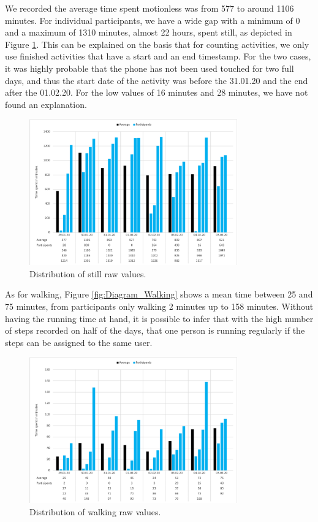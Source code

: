 
We recorded the average time spent motionless was from 577 to around 1106 minutes. For individual participants, we have a wide gap with a minimum of 0 and a maximum of 1310 minutes, almost 22 hours, spent still, as depicted in Figure \ref{fig:diagram_still}. This can be explained on the basis that for counting activities, we only use finished activities that have a start and an end timestamp. For the two cases, it was highly probable that the phone has not been used touched for two full days, and thus the start date of the activity was before the 31.01.20 and the end after the 01.02.20. For the low values of 16 minutes and 28 minutes, we have not found an explanation. 

\begin{figure}[htbp]
  \centering
  \includegraphics[width=0.8\textwidth]{figures/diagram_still}
  \caption{Distribution of still raw values.} \label{fig:diagram_still}
\end{figure}

As for walking, Figure \ref{fig:Diagram_Walking} shows a mean time between 25 and 75 minutes, from participants only walking 2 minutes up to 158 minutes. Without having the running time at hand, it is possible to infer that with the high number of steps recorded on half of the days, that one person is running regularly if the steps can be assigned to the same user.

\begin{figure}[htbp]
  \centering
  \includegraphics[width=0.8\textwidth]{figures/diagram_walking.png}
  \caption{Distribution of walking raw values.} \label{fig:diagram_walking}
\end{figure}

